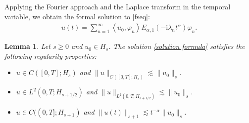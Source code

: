 \documentclass[reqno]{amsart}
\newtheorem{lem}[theorem]{Lemma}
\numberwithin{equation}{section}
\begin{document}
Applying the Fourier approach and the Laplace transform in the temporal variable, we obtain the formal solution to \eqref{fseq}:
\begin{align}
	u(t)=\sum_{n=1}^{\infty}\left\langle u_0, \varphi_n\right\rangle E_{\alpha, 1}\left(-\mathrm{i}\lambda_n t^\alpha\right) \varphi_n. \label{solution formula}
	\end{align}
\begin{lem} \label{regularity1}
	Let $s\geq 0$ and $u_0\in H_s$. The solution \eqref{solution formula} satisfies the following regularity properties:
	\begin{itemize}
		\item[(i)] $u\in C([0,T];H_s)$ and $\|u\|_{C([0,T];H_s)}\lesssim \|u_0\|_s$.
		\item[(ii)] $u\in L^2(0,T;H_{s+1/2})$ and $\|u\|_{L^2(0,T;H_{s+1/2})}\lesssim \|u_0\|_s$.
		\item[(iii)] $u\in C((0,T];H_{s+1})$ and $\|u(t)\|_{s+1}\lesssim t^{-\alpha}\|u_0\|_s$.
	\end{itemize}
	\end{lem}
\end{document}
